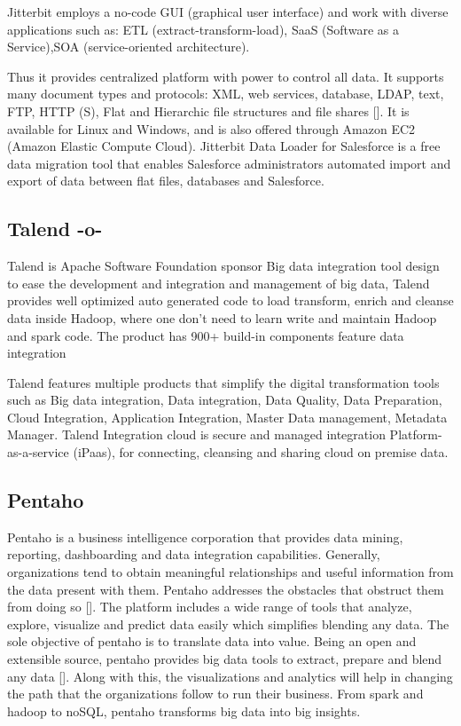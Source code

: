 Jitterbit employs a no-code GUI (graphical user interface) and work
with diverse applications such as: ETL (extract-transform-load), SaaS
(Software as a Service),SOA (service-oriented architecture).

Thus it provides centralized platform with power to control all
data. It supports many document types and protocols: XML, web
services, database, LDAP, text, FTP, HTTP (S), Flat and Hierarchic
file structures and file shares [\cite{tech-manual}]. It is available
for Linux and Windows, and is also offered through Amazon EC2 (Amazon
Elastic Compute Cloud). Jitterbit Data Loader for Salesforce is a free
data migration tool that enables Salesforce administrators automated
import and export of data between flat files, databases and
Salesforce.



\subsection{Talend -o-}

Talend is Apache Software Foundation sponsor Big data integration tool
design to ease the development and integration and management of big
data, Talend provides well optimized auto generated code to load
transform, enrich and cleanse data inside Hadoop, where one don't need
to learn write and maintain Hadoop and spark code.  The product has
900+ build-in components feature data integration
     
Talend features multiple products that simplify the digital
transformation tools such as Big data integration, Data integration,
Data Quality, Data Preparation, Cloud Integration, Application
Integration, Master Data management, Metadata Manager.  Talend
Integration cloud is secure and managed integration
Platform-as-a-service (iPaas), for connecting, cleansing and sharing
cloud on premise data.



\subsection{Pentaho}

Pentaho is a business intelligence corporation that provides data
mining, reporting, dashboarding and data integration
capabilities. Generally, organizations tend to obtain meaningful
relationships and useful information from the data present with
them. Pentaho addresses the obstacles that obstruct them from doing so
[\cite{pent1}]. The platform includes a wide range of tools that
analyze, explore, visualize and predict data easily which simplifies
blending any data. The sole objective of pentaho is to translate data
into value. Being an open and extensible source, pentaho provides big
data tools to extract, prepare and blend any data
[\cite{pent2}]. Along with this, the visualizations and analytics will
help in changing the path that the organizations follow to run their
business. From spark and hadoop to noSQL, pentaho transforms big data
into big insights.

